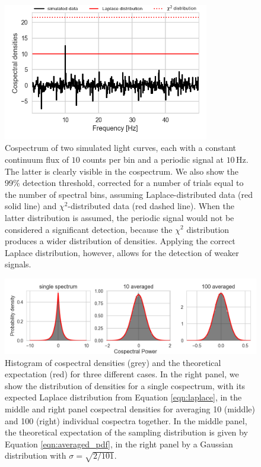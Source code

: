 \documentclass[12pt]{emulateapj}
\begin{document}
\begin{figure}
\begin{center}
\includegraphics[width=9cm]{cs_detec.png}
\caption{Cospectrum of two simulated light curves, each with a constant continuum flux of $10$ counts per bin and a periodic signal at $10\,\mathrm{Hz}$. The latter is clearly visible in the cospectrum. We also show the 99\% detection threshold, corrected for a number of trials equal to the number of spectral bins, assuming Laplace-distributed data (red solid line) and $\chi^2$-distributed data (red dashed line). When the latter distribution is assumed, the periodic signal would not be considered a significant detection, because the $\chi^2$ distribution produces a wider distribution of densities. Applying the correct Laplace distribution, however, allows for the detection of weaker signals.}
\label{fig:cs_sim}
\end{center}
\end{figure}


\begin{figure}
\begin{center}
\includegraphics[width=\textwidth]{avg_dist.png}
\caption{Histogram of cospectral densities (grey) and the theoretical expectation (red) for three different cases. In the right panel, we show the distribution of densities for a single cospectrum, with its expected Laplace distribution from Equation \ref{eqn:laplace}, in the middle and right panel cospectral densities for averaging 10 (middle) and 100 (right) individual cospectra together. In the middle panel, the theoretical expectation of the sampling distribution is given by Equation \ref{eqn:averaged_pdf}, in the right panel by a Gaussian distribution with $\sigma=\sqrt{2/101}$.}
\label{fig:avg_dist}
\end{center}
\end{figure}
\end{document}
